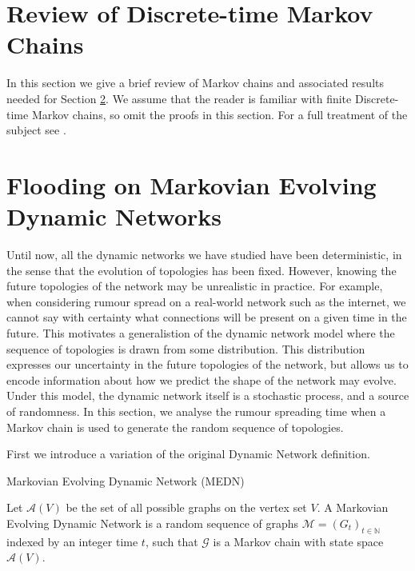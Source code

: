\section{Review of Discrete-time Markov Chains}

In this section we give a brief review of Markov chains and associated results needed for Section \ref{section:MEDNBound}. We assume that the reader is familiar with finite Discrete-time Markov chains, so omit the proofs in this section. For a full treatment of the subject see \cite{grimmetBook}.



\section{Flooding on Markovian Evolving Dynamic Networks}\label{section:MEDNBound}

Until now, all the dynamic networks we have studied have been deterministic, in the sense that the evolution of topologies has been fixed. However, knowing the future topologies of the network may be unrealistic in practice. For example, when considering rumour spread on a real-world network such as the internet, we cannot say with certainty what connections will be present on a given time in the future. This motivates a generalistion of the dynamic network model where the sequence of topologies is drawn from some distribution. This distribution expresses our uncertainty in the future topologies of the network, but allows us to encode information about how we predict the shape of the network may evolve. Under this model, the dynamic network itself is a stochastic process, and a source of randomness. In this section, we analyse the rumour spreading time when a Markov chain is used to  generate the random sequence of topologies.

First we introduce a variation of the original Dynamic Network definition.

\begin{definition}
	Markovian Evolving Dynamic Network (MEDN)

	\noindent 
	Let $\mathcal{A}(V)$ be the set of all possible graphs on the vertex set $V$.
	A Markovian Evolving Dynamic Network is a random sequence of graphs $\mathcal{M} = (G_t)_{t \in \mathbb{N}}$ indexed by an integer time $t$, such that $\mathcal{G}$ is a Markov chain with state space $\mathcal{A}(V)$.
\end{definition}

